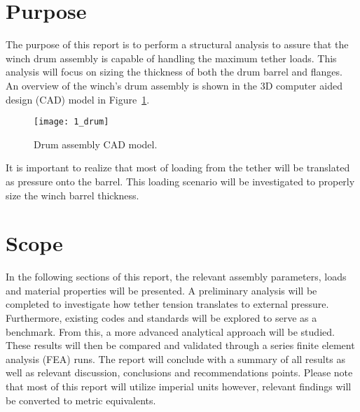 \section{Purpose}

The purpose of this report is to perform a structural analysis to assure that the winch drum assembly is capable of handling the maximum tether loads. This analysis will focus on sizing the thickness of both the drum barrel and flanges.\\

An overview of the winch's drum assembly is shown in the 3D computer aided design (CAD) model \cite{INVENTOR} in Figure~\ref{fig:1_drum}.
\begin{figure}[H]
	\centering
	\texttt{[image: 1\_drum]}
	\caption{Drum assembly CAD model.}
	\label{fig:1_drum}
\end{figure}

It is important to realize that most of loading from the tether will be translated as pressure onto the barrel. This loading scenario will be investigated to properly size the winch barrel thickness.

\section{Scope}

In the following sections of this report, the relevant assembly parameters, loads and material properties will be presented. A preliminary analysis will be completed to investigate how tether tension translates to external pressure. Furthermore, existing codes and standards will be explored to serve as a benchmark. From this, a more advanced analytical approach will be studied. These results will then be compared and validated through a series finite element analysis (FEA) runs. The report will conclude with a summary of all results as  well as relevant discussion, conclusions and recommendations points. Please note that most of this report will utilize imperial units however, relevant findings will be converted to metric equivalents.